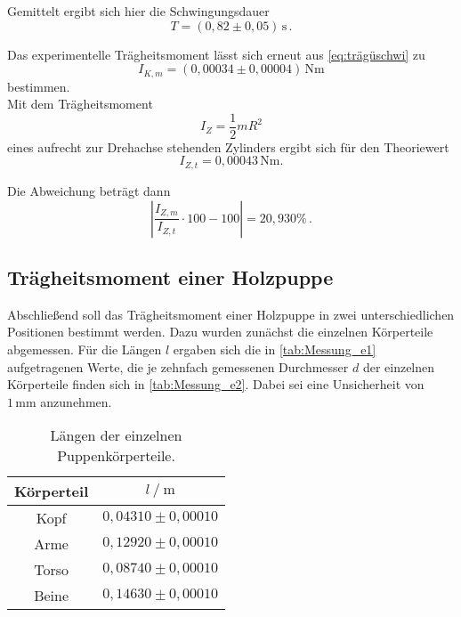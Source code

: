 Gemittelt ergibt sich hier die Schwingungsdauer
\begin{equation*}
  T = (0,82 \pm 0,05) \, \unit{\second} \,.
\end{equation*}

Das experimentelle Trägheitsmoment lässt sich erneut aus \eqref{eq:trägüschwi} zu
\begin{equation*}
  I_{K,m} = (0,00034 \pm 0,00004) \, \unit{\newton\meter}
\end{equation*} 
bestimmen. \\

Mit dem Trägheitsmoment
\begin{equation}
  I_Z = \frac{1}{2} m R^2
\end{equation}
eines aufrecht zur Drehachse stehenden Zylinders ergibt sich für den Theoriewert
\begin{equation*}
  I_{Z,t} = 0,00043 \,  \unit{\newton\meter}.
\end{equation*}

Die Abweichung beträgt dann
\begin{equation*}
  \left|\frac{I_{Z,m}}{I_{Z,t}} \cdot 100 - 100 \right| = 20,930 \% \,.
\end{equation*}

\newpage

\subsection{Trägheitsmoment einer Holzpuppe}
\label{subsec:e}

Abschließend soll das Trägheitsmoment einer Holzpuppe in zwei unterschiedlichen Positionen bestimmt werden. Dazu wurden zunächst die einzelnen Körperteile abgemessen.
Für die Längen $l$ ergaben sich die in \autoref{tab:Messung_e1} aufgetragenen Werte, die je zehnfach gemessenen Durchmesser $d$ der einzelnen Körperteile finden sich in \autoref{tab:Messung_e2}.
Dabei sei eine Unsicherheit von $1 \, \unit{\milli\meter}$ anzunehmen.

\begin{table}[H]
  \centering
  \begin{tabular}{S[table-format=2.0] S[table-format=2.2]}
      \toprule
      {Körperteil} & {$l \mathbin{/} \unit{\meter}$}\\
      \midrule
        {Kopf}  & {$0,04310 \pm 0,00010$} \\
        {Arme}  & {$0,12920 \pm 0,00010$} \\
        {Torso} & {$0,08740 \pm 0,00010$} \\
        {Beine} & {$0,14630 \pm 0,00010$} \\
      \bottomrule
  \end{tabular}
  \caption{Längen der einzelnen Puppenkörperteile.}
  \label{tab:Messung_e1}
\end{table}

